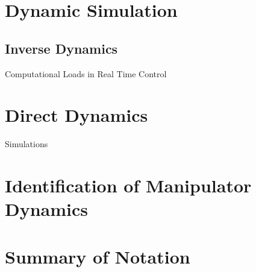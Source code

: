 \section{Dynamic Simulation}


\subsection{Inverse Dynamics}
Computational Loads in Real Time Control

\section{Direct Dynamics}
Simulations

\section{Identification of Manipulator Dynamics}

\section{Summary of Notation}


